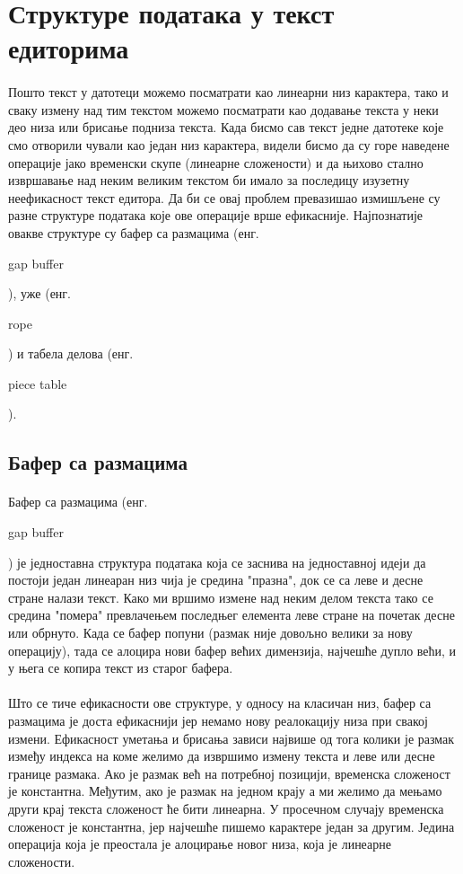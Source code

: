 \documentclass[12pt,oneside]{memoir}
\begin{document}
\section{Структуре података у текст едиторима}
\paragraph{}
Пошто текст у датотеци можемо посматрати као линеарни низ карактера, 
тако и сваку измену над тим текстом можемо посматрати као додавање текста у
неки део низа или брисање подниза текста. Када бисмо сав текст једне датотеке
које смо отворили чували као један низ карактера, видели бисмо да су горе наведене 
операције јако временски скупе (линеарне сложености) и да њихово стално извршавање
над неким великим текстом би имало за последицу изузетну неефикасност текст едитора.
Да би се овај проблем превазишао измишљене су разне структуре података које ове операције
врше ефикасније. Најпознатије овакве структуре су бафер са размацима 
(енг. \begin{latinica}gap buffer\end{latinica}), уже (енг. \begin{latinica}rope\end{latinica}) 
и табела делова (енг. \begin{latinica}piece table\end{latinica}).

\subsection{Бафер са размацима}
\paragraph{}
Бафер са размацима (енг. \begin{latinica}gap buffer\end{latinica}) је једноставна структура
података која се заснива на једноставној идеји да постоји један линеаран низ чија је средина
"празна", док се са леве и десне стране налази текст. Како ми вршимо измене над неким делом 
текста тако се средина "помера" превлачењем последњег елемента леве стране на почетак десне
или обрнуто. Када се бафер попуни (размак није довољно велики за нову операцију), тада се 
алоцира нови бафер већих димензија, најчешће дупло већи, и у њега се копира текст из старог
бафера.
\paragraph{}
Што се тиче ефикасности ове структуре, у односу на класичан низ, бафер са размацима је доста 
ефикаснији јер немамо нову реалокацију низа при свакој измени. Ефикасност уметања и 
брисања зависи највише од тога колики је размак између индекса на коме желимо да 
извршимо измену текста и леве или десне границе размака. Ако је размак већ на потребној позицији, 
временска сложеност је константна. Међутим, ако је размак на једном крају а ми желимо да 
мењамо други крај текста сложеност ће бити линеарна. У просечном случају временска 
сложеност је константна, јер најчешће пишемо карактере један за другим. 
Једина операција која је преостала је алоцирање новог низа, која је линеарне сложености.
\end{document}
